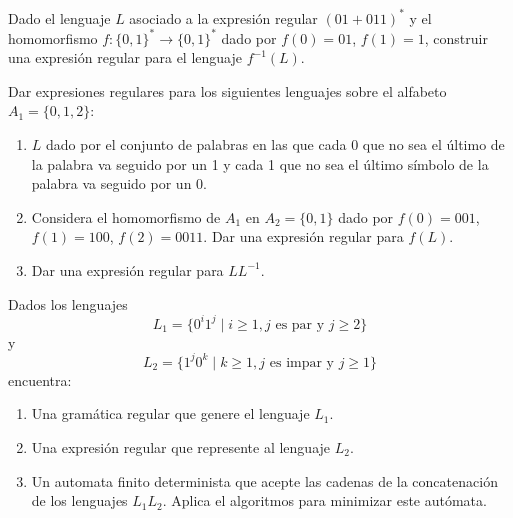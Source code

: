\begin{ejercicio}\label{ej:1.3.31}
    Dado el lenguaje $L$ asociado a la expresión regular ${(01+011)}^{\ast}$ y el homomorfismo $f:{\{0,1\}}^{\ast}\rightarrow{\{0,1\}}^{\ast}$ dado por $f(0)=01$, $f(1)=1$, construir una expresión regular para el lenguaje $f^{-1}(L)$.
\end{ejercicio}

\begin{ejercicio}\label{ej:1.3.32}
    Dar expresiones regulares para los siguientes lenguajes sobre el alfabeto $A_1=\{0,1,2\}$:
    \begin{enumerate}
        \item $L$ dado por el conjunto de palabras en las que cada 0 que no sea el último de la palabra va seguido por un 1 y cada 1 que no sea el último símbolo de la palabra va seguido por un 0.
        \item Considera el homomorfismo de $A_1$ en $A_2=\{0,1\}$  dado por $f(0)=001$, $f(1)=100$, $f(2)=0011$. Dar una expresión regular para $f(L)$.
        \item Dar una expresión regular para $LL^{-1}$.
    \end{enumerate}
\end{ejercicio}

\begin{ejercicio}\label{ej:1.3.33}
    Dados los lenguajes
    \begin{equation*}
        L_1 = \{0^i 1^j \mid i\geq 1, j\text{ es par y } j\geq 2\}
    \end{equation*}
    y
    \begin{equation*}
        L_2 = \{1^j 0^k \mid k\geq 1, j\text{ es impar y } j\geq 1\}
    \end{equation*}
    encuentra:
    \begin{enumerate}
        \item Una gramática regular que genere el lenguaje $L_1$.
        \item Una expresión regular que represente al lenguaje $L_2$.
        \item Un automata finito determinista que acepte las cadenas de la concatenación de los lenguajes $L_1L_2$. Aplica el algoritmos para minimizar este autómata.
    \end{enumerate}
\end{ejercicio}
